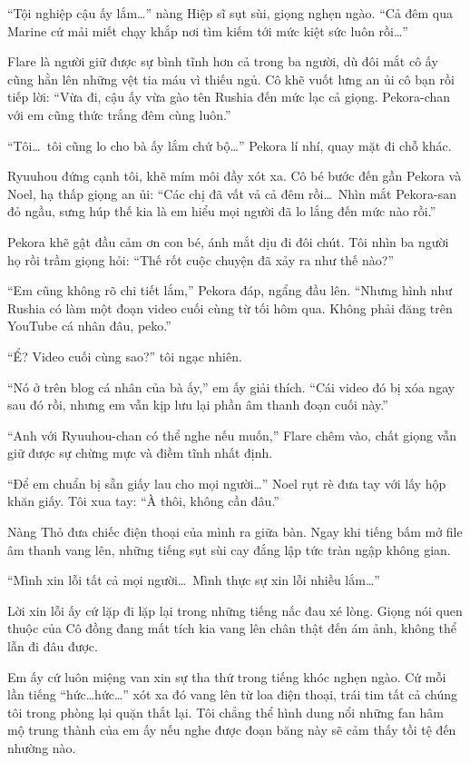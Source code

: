 \documentclass[../main.tex]{subfiles}
\begin{document}
``Tội nghiệp cậu ấy lắm\dots'' nàng Hiệp sĩ sụt sùi, giọng nghẹn ngào. ``Cả đêm qua Marine cứ mải miết chạy khắp nơi tìm kiếm tới mức kiệt sức luôn rồi\dots''

Flare là người giữ được sự bình tĩnh hơn cả trong ba người, dù đôi mắt cô ấy cũng hằn lên những vệt tia máu vì thiếu ngủ. Cô khẽ vuốt lưng an ủi cô bạn rồi tiếp lời: ``Vừa đi, cậu ấy vừa gào tên Rushia đến mức lạc cả giọng. Pekora-chan với em cũng thức trắng đêm cùng luôn.''

``Tôi\dots\ tôi cũng lo cho bà ấy lắm chứ bộ\dots'' Pekora lí nhí, quay mặt đi chỗ khác.

Ryuuhou đứng cạnh tôi, khẽ mím môi đầy xót xa. Cô bé bước đến gần Pekora và Noel, hạ thấp giọng an ủi: ``Các chị đã vất vả cả đêm rồi\dots\ Nhìn mắt Pekora-san đỏ ngầu, sưng húp thế kia là em hiểu mọi người đã lo lắng đến mức nào rồi.''

Pekora khẽ gật đầu cảm ơn con bé, ánh mắt dịu đi đôi chút. Tôi nhìn ba người họ rồi trầm giọng hỏi: ``Thế rốt cuộc chuyện đã xảy ra như thế nào?''

``Em cũng không rõ chi tiết lắm,'' Pekora đáp, ngẩng đầu lên. ``Nhưng hình như Rushia có làm một đoạn video cuối cùng từ tối hôm qua. Không phải đăng trên YouTube cá nhân đâu, peko.''

``Ể? Video cuối cùng sao?'' tôi ngạc nhiên.

``Nó ở trên blog cá nhân của bà ấy,'' em ấy giải thích. ``Cái video đó bị xóa ngay sau đó rồi, nhưng em vẫn kịp lưu lại phần âm thanh đoạn cuối này.''

``Anh với Ryuuhou-chan có thể nghe nếu muốn,'' Flare chêm vào, chất giọng vẫn giữ được sự chừng mực và điềm tĩnh nhất định.

``Để em chuẩn bị sẵn giấy lau cho mọi người\dots'' Noel rụt rè đưa tay với lấy hộp khăn giấy. Tôi xua tay: ``À thôi, không cần đâu.''

Nàng Thỏ đưa chiếc điện thoại của mình ra giữa bàn. Ngay khi tiếng bấm mở file âm thanh vang lên, những tiếng sụt sùi cay đắng lập tức tràn ngập không gian.

``Mình xin lỗi tất cả mọi người\dots\ Mình thực sự xin lỗi nhiều lắm\dots''

Lời xin lỗi ấy cứ lặp đi lặp lại trong những tiếng nấc đau xé lòng. Giọng nói quen thuộc của Cô đồng đang mất tích kia vang lên chân thật đến ám ảnh, không thể lẫn đi đâu được.

Em ấy cứ luôn miệng van xin sự tha thứ trong tiếng khóc nghẹn ngào. Cứ mỗi lần tiếng ``hức\dots hức\dots'' xót xa đó vang lên từ loa điện thoại, trái tim tất cả chúng tôi trong phòng lại quặn thắt lại. Tôi chẳng thể hình dung nổi những fan hâm mộ trung thành của em ấy nếu nghe được đoạn băng này sẽ cảm thấy tồi tệ đến nhường nào.
\end{document}
